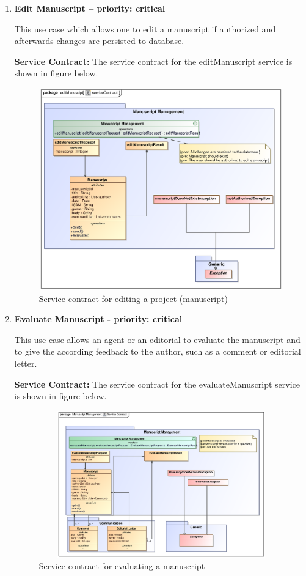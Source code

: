 \begin{enumerate}
\newpage

\item \textbf{Edit Manuscript – priority: critical}
\par{This use case which allows one to edit a manuscript if authorized and afterwards changes are persisted to database.}

\par{\textbf{Service Contract:} The service contract for the editManuscript service is shown in figure below.}

\begin{figure}[h]
\includegraphics[height=330px, width=500px]{epsImages/ManuscriptManagement/editManuscript.eps}
\caption{Service contract for editing a  project (manuscript)}
\end{figure}
\newpage

\item \textbf{Evaluate Manuscript - priority: critical}
\par{This use case allows an agent or an editorial to evaluate the manuscript and to give the according feedback to the author, such as a comment or editorial letter.}

\par{\textbf{Service Contract:} The service contract for the evaluateManuscript service is shown in figure below.}

\begin{figure}[h]
\includegraphics[height=240px, width=500px]{epsImages/ManuscriptManagement/EvaluateManuscript.eps}
\caption{Service contract for evaluating a manuscript}
\end{figure}


\end{enumerate}

